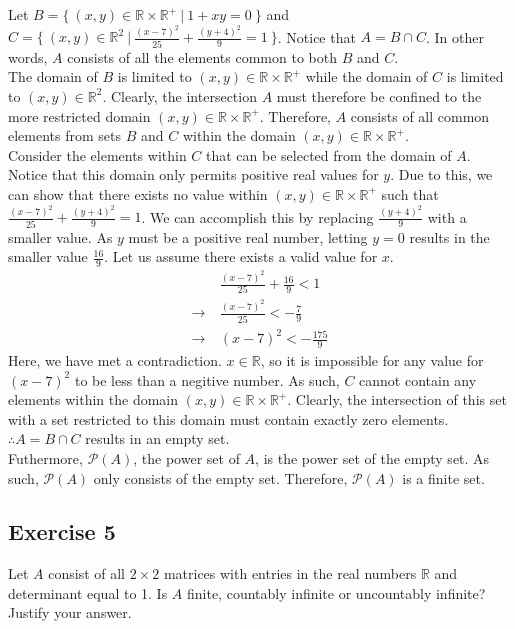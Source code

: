 \documentclass[12pt]{article}
\begin{document}
Let $B = \{\ (x,y) \in \mathbb{R} \times \mathbb{R}^{+}\ |\ 1 + xy = 0\ \}$ and $C = \{\ (x,y) \in \mathbb{R}^{2}\ |\ \frac{{(x - 7)}^{2}}{25} + \frac{{(y + 4)}^{2}}{9} = 1\ \}$.
Notice that $A = B \cap C$. In other words, $A$ consists of all the elements common to both $B$ and $C$.
\\
The domain of $B$ is limited to $(x,y) \in \mathbb{R} \times \mathbb{R}^{+}$ while the domain of $C$ is limited to $(x,y) \in \mathbb{R}^{2}$.
Clearly, the intersection $A$ must therefore be confined to the more restricted domain $(x,y) \in \mathbb{R} \times \mathbb{R}^{+}$.
Therefore, $A$ consists of all common elements from sets $B$ and $C$ within the domain $(x,y) \in \mathbb{R} \times \mathbb{R}^{+}$.
\\
Consider the elements within $C$ that can be selected from the domain of $A$.
Notice that this domain only permits positive real values for $y$.
Due to this, we can show that there exists no value within $(x,y) \in \mathbb{R} \times \mathbb{R}^{+}$ such that $\frac{{(x - 7)}^{2}}{25} + \frac{{(y + 4)}^{2}}{9} = 1$.
We can accomplish this by replacing $\frac{{(y + 4)}^{2}}{9}$ with a smaller value.
As $y$ must be a positive real number, letting $y = 0$ results in the smaller value $\frac{16}{9}$.
Let us assume there exists a valid value for $x$.
\begin{align*}
	& \frac{{(x - 7)}^{2}}{25} + \frac{16}{9} < 1 \\
	\rightarrow\ & \frac{{(x - 7)}^{2}}{25} < -\frac{7}{9} \\
	\rightarrow\ & {(x - 7)}^{2} < -\frac{175}{9}
\end{align*}
Here, we have met a contradiction. $x \in \mathbb{R}$, so it is impossible for any value for ${(x-7)}^{2}$ to be less than a negitive number.
As such, $C$ cannot contain any elements within the domain $(x,y) \in \mathbb{R} \times \mathbb{R}^{+}$.
Clearly, the intersection of this set with a set restricted to this domain must contain exactly zero elements.
$\therefore A = B \cap C$ results in an empty set.
\\
Futhermore, $\mathcal{P}(A)$, the power set of $A$, is the power set of the empty set.
As such, $\mathcal{P}(A)$ only consists of the empty set.
Therefore, $\mathcal{P}(A)$ is a finite set.

\subsection*{Exercise 5}

Let $A$ consist of all $2 \times 2$ matrices with entries in the real numbers $\mathbb{R}$ and determinant equal to 1.
Is $A$ finite, countably infinite or uncountably infinite? Justify your answer.
\end{document}
